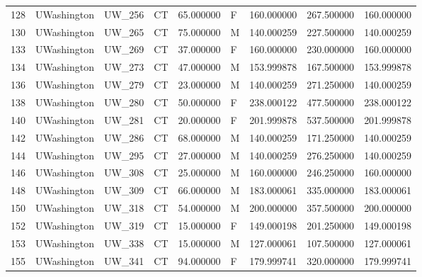 \begin{tabular}{llllrlrrr}
128    &     UWashington &       UW\_256 &                 CT &  65.000000 &        F &       160.000000 &    267.500000 &  160.000000 \\
130    &     UWashington &       UW\_265 &                 CT &  75.000000 &        M &       140.000259 &    227.500000 &  140.000259 \\
133    &     UWashington &       UW\_269 &                 CT &  37.000000 &        F &       160.000000 &    230.000000 &  160.000000 \\
134    &     UWashington &       UW\_273 &                 CT &  47.000000 &        M &       153.999878 &    167.500000 &  153.999878 \\
136    &     UWashington &       UW\_279 &                 CT &  23.000000 &        M &       140.000259 &    271.250000 &  140.000259 \\
138    &     UWashington &       UW\_280 &                 CT &  50.000000 &        F &       238.000122 &    477.500000 &  238.000122 \\
140    &     UWashington &       UW\_281 &                 CT &  20.000000 &        F &       201.999878 &    537.500000 &  201.999878 \\
142    &     UWashington &       UW\_286 &                 CT &  68.000000 &        M &       140.000259 &    171.250000 &  140.000259 \\
144    &     UWashington &       UW\_295 &                 CT &  27.000000 &        M &       140.000259 &    276.250000 &  140.000259 \\
146    &     UWashington &       UW\_308 &                 CT &  25.000000 &        M &       160.000000 &    246.250000 &  160.000000 \\
148    &     UWashington &       UW\_309 &                 CT &  66.000000 &        M &       183.000061 &    335.000000 &  183.000061 \\
150    &     UWashington &       UW\_318 &                 CT &  54.000000 &        M &       200.000000 &    357.500000 &  200.000000 \\
152    &     UWashington &       UW\_319 &                 CT &  15.000000 &        F &       149.000198 &    201.250000 &  149.000198 \\
153    &     UWashington &       UW\_338 &                 CT &  15.000000 &        M &       127.000061 &    107.500000 &  127.000061 \\
155    &     UWashington &       UW\_341 &                 CT &  94.000000 &        F &       179.999741 &    320.000000 &  179.999741 \\

\end{tabular}
